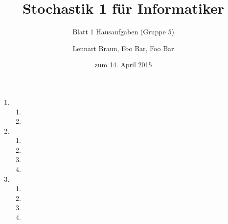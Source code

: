 \documentclass[a4paper]{scrartcl}
\title{Stochastik 1 für Informatiker}
\subtitle{Blatt 1 Hausaufgaben (Gruppe 5)}
\author{
	Lennart Braun,
    Foo Bar,
    Foo Bar
}
\date{zum 14. April 2015}
\begin{document}
\maketitle

\begin{enumerate}[label=\bfseries\arabic*.]
    \item
        \begin{enumerate}[label=(\alph*)]
            \item

            \item

        \end{enumerate}

    \item
        \begin{enumerate}[label=(\alph*)]
            \item

            \item

            \item

            \item

        \end{enumerate}

    \item
        \begin{enumerate}[label=(\alph*)]
            \item

            \item

            \item

            \item

        \end{enumerate}

\end{enumerate}
\end{document}
